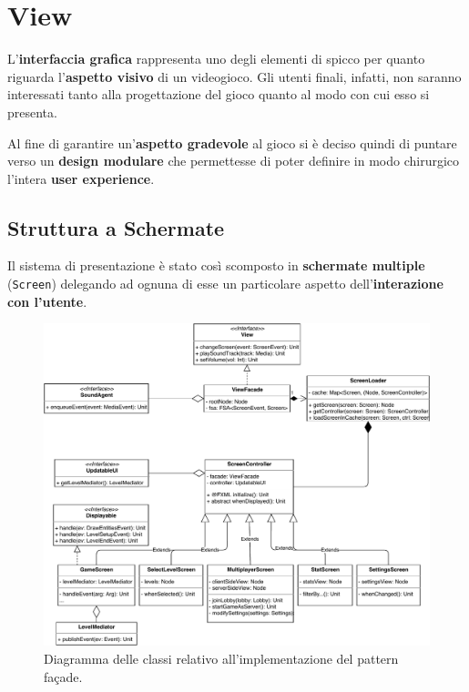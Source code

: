 \section{View}
\label{sec:view_design}

L'\textbf{interfaccia grafica} rappresenta uno degli elementi di spicco per quanto riguarda l'\textbf{aspetto visivo} di un videogioco. Gli utenti finali, infatti, non saranno interessati tanto alla progettazione del gioco quanto al modo con cui esso si presenta.

Al fine di garantire un'\textbf{aspetto gradevole} al gioco si è deciso quindi di puntare verso un \textbf{design modulare} che permettesse di poter definire in modo chirurgico l'intera \textbf{user experience}.

\subsection{Struttura a Schermate}
Il sistema di presentazione è stato così scomposto in \textbf{schermate multiple} (\texttt{Screen}) delegando ad ognuna di esse un particolare aspetto dell'\textbf{interazione con l'utente}.

\begin{figure}[H]
	\centering
	\includegraphics[width=0.99\columnwidth]{drawio/viewFacade/viewFacade.pdf}
	\caption{Diagramma delle classi relativo all'implementazione del pattern façade.}
	\label{fig:viewFacade}
\end{figure}

